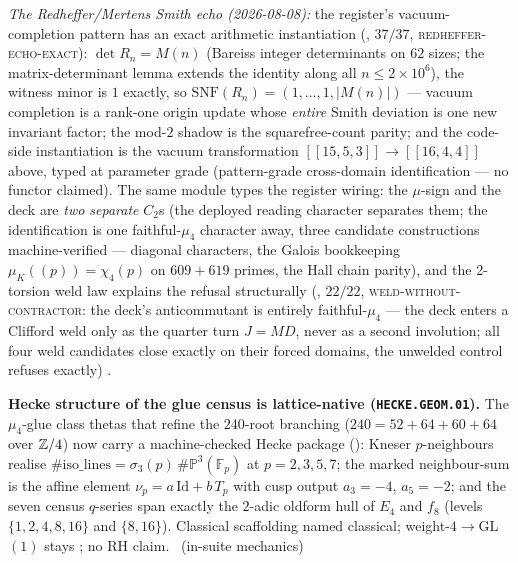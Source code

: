 \emph{The Redheffer/Mertens Smith echo (2026-08-08):} the
register's vacuum-completion pattern has an exact arithmetic
instantiation (, $37/37$,
\textsc{redheffer-echo-exact}): $\det R_n = M(n)$ (Bareiss
integer determinants on $62$ sizes; the matrix-determinant lemma
extends the identity along all $n \le 2\times10^6$), the witness
minor is $1$ exactly, so $\mathrm{SNF}(R_n) = (1, \dots, 1,
|M(n)|)$ --- vacuum completion is a rank-one origin update whose
\emph{entire} Smith deviation is one new invariant factor; the
mod-$2$ shadow is the squarefree-count parity; and the code-side
instantiation is the vacuum transformation $[[15,5,3]] \to
[[16,4,4]]$ above, typed at parameter grade (pattern-grade
cross-domain identification --- no functor claimed).  The same
module types the register wiring: the $\mu$-sign and the deck
are \emph{two separate} $C_2$s (the deployed reading character
separates them; the identification is one faithful-$\mu_4$
character away, three candidate constructions machine-verified
--- diagonal characters, the Galois bookkeeping $\mu_K((p)) =
\chi_4(p)$ on $609 + 619$ primes, the Hall chain parity), and
the 2-torsion weld law explains the refusal structurally
(, $22/22$,
\textsc{weld-without-contractor}: the deck's anticommutant is
entirely faithful-$\mu_4$ --- the deck enters a Clifford weld
only as the quarter turn $J = MD$, never as a second involution;
all four weld candidates close exactly on their forced domains,
the unwelded control refuses exactly) \mE.

\par\smallskip\noindent\textbf{Hecke structure of the glue census is lattice-native
(\texttt{HECKE.GEOM.01}).}
The $\mu_4$-glue class thetas that refine the $240$-root branching ($240=52{+}64{+}60{+}64$ over
$\mathbb{Z}/4$) now carry a machine-checked Hecke package
(): Kneser $p$-neighbours realise
$\#\mathrm{iso\_lines}=\sigma_3(p)\,\#\mathbb P^3(\mathbb F_p)$ at $p=2,3,5,7$; the marked
neighbour-sum is the affine element $\nu_p=a\,\mathrm{Id}+b\,T_p$ with cusp output
$a_3=-4$, $a_5=-2$; and the seven census $q$-series span exactly the $2$-adic oldform hull of
$E_4$ and $f_8$ (levels $\{1,2,4,8,16\}$ and $\{8,16\}$). Classical scaffolding named classical;
weight-$4\to$GL$(1)$ stays \mO; no RH claim. \mE\ (in-suite mechanics)


